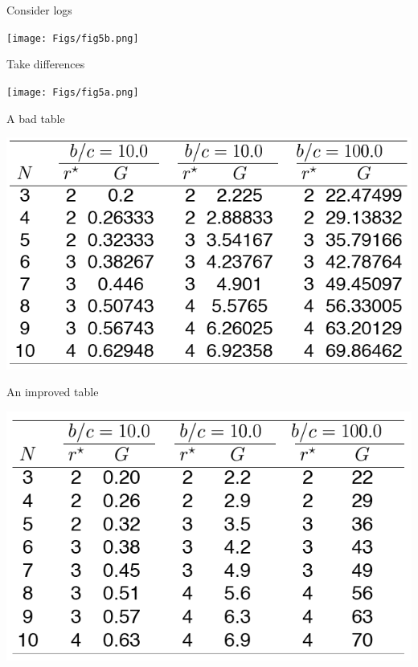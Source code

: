 \documentclass[12pt]{article}
\newcommand{\headsize}{\fontsize{35}{35} \selectfont}
\begin{document}
\headsize \color{yellow}
\hfill \begin{minipage}{5.75in}
\centering
Consider logs
\end{minipage}

\vspace{30mm}

\centerline{\texttt{[image: Figs/fig5b.png]}}

\newpage


\headsize \color{yellow}
\hfill \begin{minipage}{5.75in}
\centering
Take differences
\end{minipage}

\vspace{30mm}

\centerline{\texttt{[image: Figs/fig5a.png]}}




\newpage

\headsize \color{yellow}
\hfill \begin{minipage}{5.75in}
\centering
A bad table
\end{minipage}

\vspace{30mm}

\centerline{\includegraphics[width=8in]{Figs/tableB.png}}


\newpage


\headsize \color{yellow}
\hfill \begin{minipage}{5.75in}
\centering
An improved table
\end{minipage}

\vspace{30mm}

\centerline{\includegraphics[width=8in]{Figs/tableA.png}}
\end{document}

